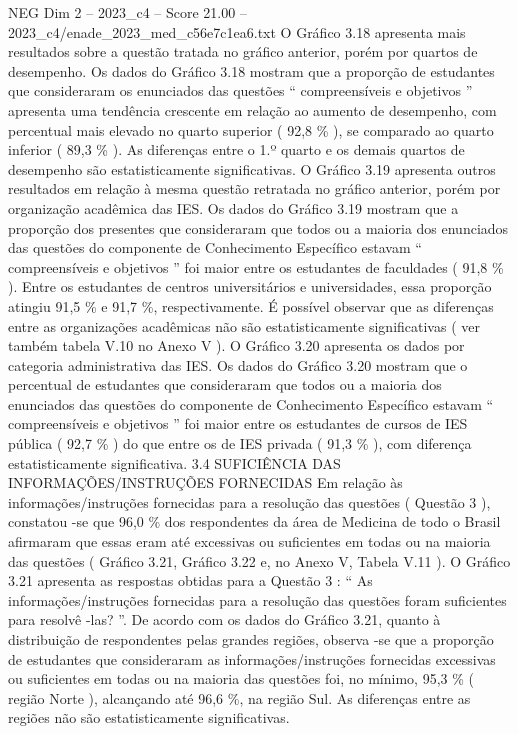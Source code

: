 \begin{textsample}{NEG Dim 2 – 2023\_c4 – Score 21.00 – 2023\_c4/enade\_2023\_med\_c56e7c1ea6.txt}
O Gráfico 3.18 apresenta mais resultados sobre a questão tratada no gráfico anterior, porém por quartos de desempenho.
Os dados do Gráfico 3.18 mostram que a proporção de estudantes que consideraram os enunciados das questões “ compreensíveis e objetivos ” apresenta uma tendência crescente em relação ao aumento de desempenho, com percentual mais elevado no quarto superior ( 92,8 \% ), se comparado ao quarto inferior ( 89,3 \% ).
As diferenças entre o 1.º quarto e os demais quartos de desempenho são estatisticamente significativas.
O Gráfico 3.19 apresenta outros resultados em relação à mesma questão retratada no gráfico anterior, porém por organização acadêmica das IES.
Os dados do Gráfico 3.19 mostram que a proporção dos presentes que consideraram que todos ou a maioria dos enunciados das questões do componente de Conhecimento Específico estavam “ compreensíveis e objetivos ” foi maior entre os estudantes de faculdades ( 91,8 \% ).
Entre os estudantes de centros universitários e universidades, essa proporção atingiu 91,5 \% e 91,7 \%, respectivamente.
É possível observar que as diferenças entre as organizações acadêmicas não são estatisticamente significativas ( ver também tabela V.10 no Anexo V ).
O Gráfico 3.20 apresenta os dados por categoria administrativa das IES.
Os dados do Gráfico 3.20 mostram que o percentual de estudantes que consideraram que todos ou a maioria dos enunciados das questões do componente de Conhecimento Específico estavam “ compreensíveis e objetivos ” foi maior entre os estudantes de cursos de IES pública ( 92,7 \% ) do que entre os de IES privada ( 91,3 \% ), com diferença estatisticamente significativa. 3.4 SUFICIÊNCIA DAS INFORMAÇÕES/INSTRUÇÕES FORNECIDAS Em relação às informações/instruções fornecidas para a resolução das questões ( Questão 3 ), constatou -se que 96,0 \% dos respondentes da área de Medicina de todo o Brasil afirmaram que essas eram até excessivas ou suficientes em todas ou na maioria das questões ( Gráfico 3.21, Gráfico 3.22 e, no Anexo V, Tabela V.11 ).
O Gráfico 3.21 apresenta as respostas obtidas para a Questão 3 : “ As informações/instruções fornecidas para a resolução das questões foram suficientes para resolvê -las? ”.
De acordo com os dados do Gráfico 3.21, quanto à distribuição de respondentes pelas grandes regiões, observa -se que a proporção de estudantes que consideraram as informações/instruções fornecidas excessivas ou suficientes em todas ou na maioria das questões foi, no mínimo, 95,3 \% ( região Norte ), alcançando até 96,6 \%, na região Sul.
As diferenças entre as regiões não são estatisticamente significativas.

\end{textsample}

